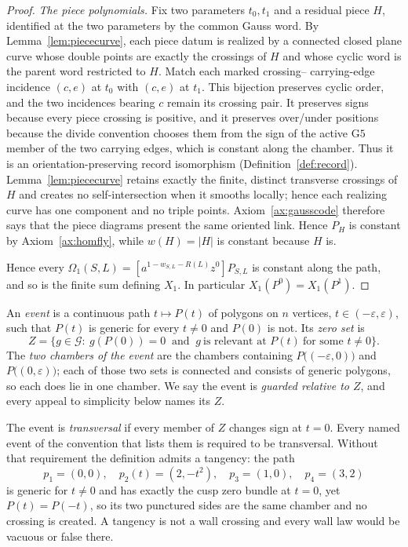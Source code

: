 \begin{proof}
\emph{The piece polynomials.} Fix two parameters $t_0,t_1$ and a residual
piece $H$, identified at the two parameters by the common Gauss word. By
Lemma~\ref{lem:piececurve}, each piece datum is realized by a connected closed
plane curve whose double points are exactly the crossings of $H$ and whose
cyclic word is the parent word restricted to $H$. Match each marked crossing--
carrying-edge incidence $(c,e)$ at $t_0$ with $(c,e)$ at $t_1$. This bijection
preserves cyclic order, and the two incidences bearing $c$ remain its crossing
pair. It preserves signs because every piece crossing is positive, and it
preserves over/under
positions because the divide convention chooses them from the sign of the
active $\mathrm{G5}$ member of the two carrying edges, which is constant along
the chamber. Thus it is an orientation-preserving record isomorphism
(Definition~\ref{def:record}). Lemma~\ref{lem:piececurve} retains exactly
the finite, distinct transverse crossings of $H$
and creates no self-intersection when it smooths locally; hence each realizing
curve has one component and no triple points. Axiom~\ref{ax:gausscode}
therefore says that the piece diagrams present the same oriented link. Hence
$P_H$ is constant by Axiom~\ref{ax:homfly}, while $w(H)=|H|$ is constant because
$H$ is.

Hence every $\Omega_1(S,L)=[a^{1-w_{S,L}-R(L)}z^0]P_{S,L}$ is constant along the
path, and so is the finite sum defining $X_1$. In particular
$X_1(P^0)=X_1(P^1)$.
\end{proof}

\begin{definition}\label{def:event}
An \emph{event} is a continuous path $t\mapsto P(t)$ of polygons on $n$
vertices, $t\in(-\varepsilon,\varepsilon)$, such that $P(t)$ is generic for
every $t\neq0$ and $P(0)$ is not. Its \emph{zero set} is
\[
   Z=\bigl\{g\in\mathcal G:\ g(P(0))=0\ \text{ and }\ g\ \text{is relevant at }
   P(t)\ \text{for some }t\neq0\bigr\}.
\]
The \emph{two chambers of the event} are the chambers containing
$P\bigl((-\varepsilon,0)\bigr)$ and $P\bigl((0,\varepsilon)\bigr)$; each of
those two sets is connected and consists of generic polygons, so each does lie
in one chamber. We say the event is \emph{guarded relative
to $Z$}, and every appeal to simplicity below names its $Z$.

The event is \emph{transversal} if every member of $Z$ changes sign at $t=0$.
Every named event of the convention that lists them is required to be
transversal. Without that requirement the definition admits a tangency: the
path
\[
   p_1=(0,0),\quad p_2(t)=(2,-t^2),\quad p_3=(1,0),\quad p_4=(3,2)
\]
is generic for $t\neq0$ and has exactly the cusp zero bundle at $t=0$, yet
$P(t)=P(-t)$, so its two punctured sides are the same chamber and no crossing
is created. A tangency is not a wall crossing and every wall law would be
vacuous or false there.
\end{definition}

